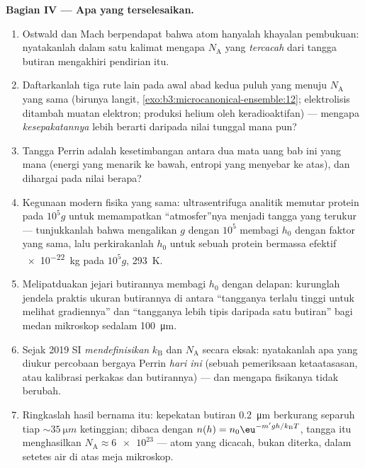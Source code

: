 \begin{problem}
\medskip\noindent\textbf{Bagian IV --- Apa yang terselesaikan.}
\begin{enumerate}[resume]
  \item Ostwald dan Mach berpendapat bahwa atom hanyalah khayalan
        pembukuan: nyatakanlah dalam satu kalimat mengapa $N_{\text{A}}$
        yang \emph{tercacah} dari tangga butiran mengakhiri pendirian itu.
  \item Daftarkanlah tiga rute lain pada awal abad kedua puluh yang menuju
        $N_{\text{A}}$ yang sama (birunya langit,
        \cref{exo:b3:microcanonical-ensemble:12}; elektrolisis
        ditambah muatan elektron; produksi helium oleh keradioaktifan)
        --- mengapa \emph{kesepakatannya} lebih berarti daripada nilai
        tunggal mana pun?
  \item Tangga Perrin adalah kesetimbangan antara dua mata uang bab ini
        yang mana (energi yang menarik ke bawah, entropi yang menyebar
        ke atas), dan dihargai pada nilai berapa?
  \item Kegunaan modern fisika yang sama: ultrasentrifuga analitik
        memutar protein pada $10^5g$ untuk memampatkan
        ``atmosfer''nya menjadi tangga yang terukur --- tunjukkanlah
        bahwa mengalikan $g$ dengan $10^5$ membagi $h_0$ dengan faktor
        yang sama, lalu perkirakanlah $h_0$ untuk sebuah protein
        bermassa efektif \qty{e-22}{kg} pada $10^5g$, \qty{293}{K}.
  \item Melipatduakan jejari butirannya membagi $h_0$ dengan delapan:
        kurunglah jendela praktis ukuran butirannya di antara ``tangganya
        terlalu tinggi untuk melihat gradiennya'' dan ``tangganya lebih
        tipis daripada satu butiran'' bagi medan mikroskop sedalam
        \qty{100}{\micro m}.
  \item Sejak 2019 SI \emph{mendefinisikan} $k_{\text{B}}$ dan
        $N_{\text{A}}$ secara eksak: nyatakanlah apa yang diukur
        percobaan bergaya Perrin \emph{hari ini} (sebuah pemeriksaan
        ketaatasasan, atau kalibrasi perkakas dan butirannya) --- dan
        mengapa fisikanya tidak berubah.
  \item Ringkaslah hasil bernama itu: kepekatan butiran
        \qty{0.2}{\micro m} berkurang separuh tiap $\sim\qty{35}{\micro m}$
        ketinggian; dibaca dengan $n(h) = n_0\eu^{-m'gh/k_{\text{B}}T}$,
        tangga itu menghasilkan $N_{\text{A}} \approx \num{6e23}$ ---
        atom yang dicacah, bukan diterka, dalam setetes air di atas meja
        mikroskop.
\end{enumerate}
\end{problem}
